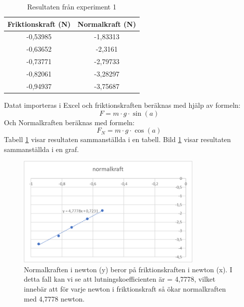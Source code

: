 \documentclass[11p, titlepage, oneside, a4paper]{article}
\begin{document}
\begin{table}
    \begin{center}
        \begin{tabular}{ |c|c| }
            \hline
            Friktionskraft (N) & Normalkraft (N)  \\
            \hline
            -0,53985 & -1,83313 \\
            -0,63652 & -2,3161 \\
            -0,73771 & -2,79733 \\
            -0,82061 & -3,28297 \\
            -0,94937 & -3,75687 \\
            \hline
        \end{tabular}
        \caption{Resultaten från experiment 1}
        \label{table:result1.1}
    \end{center}
\end{table}

Datat importeras i Excel och friktionskraften beräknas med hjälp av formeln:
    \begin{equation}
        F = {m}\cdot{g}\cdot{\sin(a)}
    \end{equation}
    Och Normalkraften beräknas med formeln:
    \begin{equation}
        F_N = {m}\cdot{g}\cdot{\cos(a)}
    \end{equation}
    Tabell \ref{table:result1.1} visar resultaten sammanställda i en tabell.
    Bild \ref{fig:graf1} visar resultaten sammanställda i en graf.

        \begin{figure}[!h]
            \includegraphics[width=0.8\textwidth]{images/lutandeplangraf}
            \caption{Normalkraften i newton (y) beror på friktionskraften i newton (x). I detta fall kan vi se att lutningskoefficienten är = 4,7778, vilket innebär att för varje newton i friktionskraft så ökar normalkraften med 4,7778 newton.}
            \label{fig:graf1}
        \end{figure}
\end{document}
